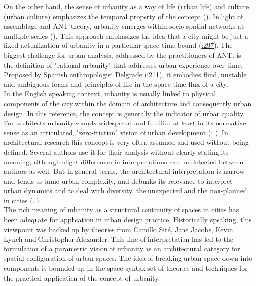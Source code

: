 \documentclass[11pt]{report}
\begin{document}
{{{On the other hand, the sense of urbanity as a way of life (urban life) and culture (urban culture) emphasizes the temporal property of the concept (\href{Farias}{\citealt{farias_introduction:_2011}}).
In light of assemblage and ANT theory, urbanity emerges within socio-spatial networks at multiple scales (\href{Kamalipour}{\citealt{kamalipour_assemblage_2015}}).
This approach emphasizes the idea that a city might be just a fixed actualization of urbanity in a particular space-time bound (\href{Farias}{\citealt{farias_introduction:_2011}:297}).
The biggest challenge for urban analysis, addressed by the practitioners of ANT, is the definition of "rational urbanity" that addresses urban experience over time.
Proposed by Spanish anthropologist Delgrade (\citealt{(Farias and Bender 2011)}:211), it embodies fluid, unstable and ambiguous forms and principles of life in the space-time flux of a city.
\\

In the English speaking context, urbanity is usually linked to physical components of the city within the domain of architecture and consequently urban design.
In this reference, the concept is generally the indicator of urban quality. For architects urbanity sounds widespread and familiar at least in its normative sense as an articulated, "zero-friction" vision of urban development (\href{ref}{\citealt{Hajer 1999}}; \href{wust}{\cite{wust_urbanity_2005}}).
In architectural research this concept is very often assumed and used without being defined.
Several authors use it for their analysis without clearly stating its meaning, although slight differences in interpretations can be detected between authors as well.
But in general terms, the architectural interpretation is narrow and tends to tame urban complexity, and debunks its relevance to interpret urban dynamics  and to deal with diversity, the unexpected and the non-planned in cities (\href{Groth}{\citealt{groth_reclaiming_2005}}, \href{Wuest}{\citealt{wust_urbanity_2005}}). 
\\

The rich meaning of urbanity as a structural continuity of spaces in cities has been adequate for application in urban design practice. Historically speaking, this viewpoint was backed up by theories from Camillo Sité, Jane Jacobs, Kevin Lynch and Christopher Alexander.
This line of interpretation has led to the formulation of a parametric vision of urbanity as an architectural category for spatial configuration of urban spaces.
The idea of breaking urban space down into components is bounded up in the space syntax set of theories and techniques for the practical application of the concept of urbanity.
\\

}}}
\end{document}
